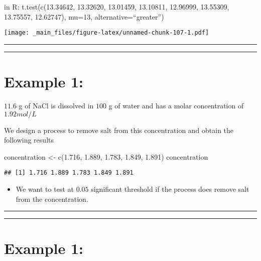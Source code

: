 \documentclass[
]{book}
\newenvironment{Shaded}{\begin{snugshade}}{\end{snugshade}}
\newcommand{\FloatTok}[1]{\textcolor[rgb]{0.00,0.00,0.81}{#1}}
\newcommand{\FunctionTok}[1]{\textcolor[rgb]{0.00,0.00,0.00}{#1}}
\newcommand{\NormalTok}[1]{#1}
\newcommand{\OtherTok}[1]{\textcolor[rgb]{0.56,0.35,0.01}{#1}}
\providecommand{\tightlist}{%
  \setlength{\itemsep}{0pt}\setlength{\parskip}{0pt}}
\begin{document}
in R:
t.test(c(13.34642, 13.32620, 13.01459, 13.10811,
12.96999, 13.55309, 13.75557, 12.62747), mu=13, alternative=``greater'')

\texttt{[image: \_main\_files/figure-latex/unnamed-chunk-107-1.pdf]}

\begin{center}\rule{0.5\linewidth}{0.5pt}\end{center}

\begin{center}\rule{0.5\linewidth}{0.5pt}\end{center}

\hypertarget{example-1-4}{%
\section{Example 1:}\label{example-1-4}}

\(11.6\) g of NaCl is dissolved in \(100\) g of water and has a molar concentration of \(1.92 mol/L\)

We design a process to remove salt from this concentration and obtain the following results

\begin{Shaded}
\begin{Highlighting}[]
\NormalTok{concentration }\OtherTok{\textless{}{-}} \FunctionTok{c}\NormalTok{(}\FloatTok{1.716}\NormalTok{, }\FloatTok{1.889}\NormalTok{, }\FloatTok{1.783}\NormalTok{, }\FloatTok{1.849}\NormalTok{, }\FloatTok{1.891}\NormalTok{)}
\NormalTok{concentration}
\end{Highlighting}
\end{Shaded}

\begin{verbatim}
## [1] 1.716 1.889 1.783 1.849 1.891
\end{verbatim}

\begin{itemize}
\tightlist
\item
  We want to test at \(0.05\) significant threshold if the process does remove salt from the concentration.
\end{itemize}

\begin{center}\rule{0.5\linewidth}{0.5pt}\end{center}

\begin{center}\rule{0.5\linewidth}{0.5pt}\end{center}

\hypertarget{example-1-5}{%
\section{Example 1:}\label{example-1-5}}
\end{document}
